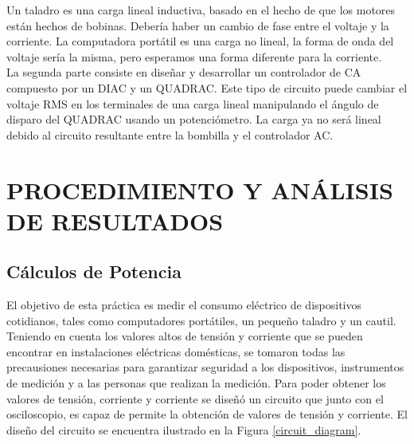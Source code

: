 \documentclass[journal]{IEEEtran}
\begin{document}
Un taladro es una carga lineal inductiva, basado 
en el hecho de que los motores están hechos de 
bobinas. Debería haber un cambio de fase entre el 
voltaje y la corriente. La computadora portátil 
es una carga no lineal, la forma de onda del voltaje 
sería la misma, pero esperamos una forma diferente 
para la corriente. \\

La segunda parte consiste en diseñar y desarrollar 
un controlador de CA compuesto por un DIAC y un 
QUADRAC. Este tipo de circuito puede cambiar el 
voltaje RMS en los terminales de una carga lineal 
manipulando el ángulo de disparo del QUADRAC usando 
un potenciómetro. La carga ya no será lineal debido 
al circuito resultante entre la bombilla y el 
controlador AC.



\section{PROCEDIMIENTO Y ANÁLISIS DE RESULTADOS}

\subsection{Cálculos de Potencia}

El objetivo de esta práctica es medir el consumo eléctrico 
de dispositivos cotidianos, tales como computadores 
portátiles, un pequeño taladro y un cautil. Teniendo en 
cuenta los valores altos de tensión y corriente que se 
pueden encontrar en instalaciones eléctricas domésticas, se
tomaron todas las precausiones necesarias para garantizar 
seguridad a los dispositivos, instrumentos de medición y 
a las personas que realizan la medición. Para poder 
obtener los valores de tensión, corriente y corriente se 
diseñó un circuito que junto con el osciloscopio, es capaz de
permite la obtención de valores de tensión y corriente. El 
diseño del circuito se encuentra ilustrado en la Figura 
\ref{circuit_diagram}.

\end{document}
